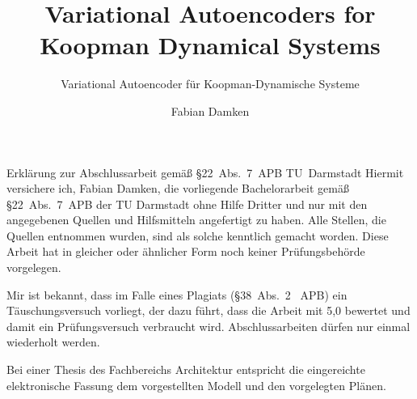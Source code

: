 \documentclass[
	ruledheaders=section,
	class=report,
	thesis={type=bachelor},
	accentcolor=1c,
	custommargins=false,
	marginpar=false,
	BCOR=0mm, %
	parskip=half-,
	fontsize=11pt,
	instbox=false,
	twoside
]{tudapub}
\begin{document}


	\title{Variational Autoencoders for Koopman Dynamical Systems}
	\subtitle{Variational Autoencoder für Koopman-Dynamische Systeme}

	\author{Fabian Damken}

	\examdate{\today}

	\maketitle

	
	

	\begin{affidavit*}[ngerman]{Erklärung zur Abschlussarbeit gemäß \S{}22~Abs.~7~APB TU~Darmstadt}
		Hiermit versichere ich, Fabian Damken, die vorliegende Bachelorarbeit gemäß \S{}22~Abs.~7~APB der TU Darmstadt ohne Hilfe Dritter und nur mit den angegebenen Quellen und Hilfsmitteln angefertigt zu haben. Alle Stellen, die Quellen entnommen wurden, sind als solche kenntlich gemacht worden. Diese Arbeit hat in gleicher oder ähnlicher Form noch keiner Prüfungsbehörde vorgelegen.

		Mir ist bekannt, dass im Falle eines Plagiats (\S{}38~Abs.~2 ~APB) ein Täuschungsversuch vorliegt, der dazu führt, dass die Arbeit mit 5,0 bewertet und damit ein Prüfungsversuch verbraucht wird. Abschlussarbeiten dürfen nur einmal wiederholt werden.

		Bei einer Thesis des Fachbereichs Architektur entspricht die eingereichte elektronische Fassung dem vorgestellten Modell und den vorgelegten Plänen.
	\end{affidavit*}
	\AffidavitSignature[Darmstadt]
\end{document}
